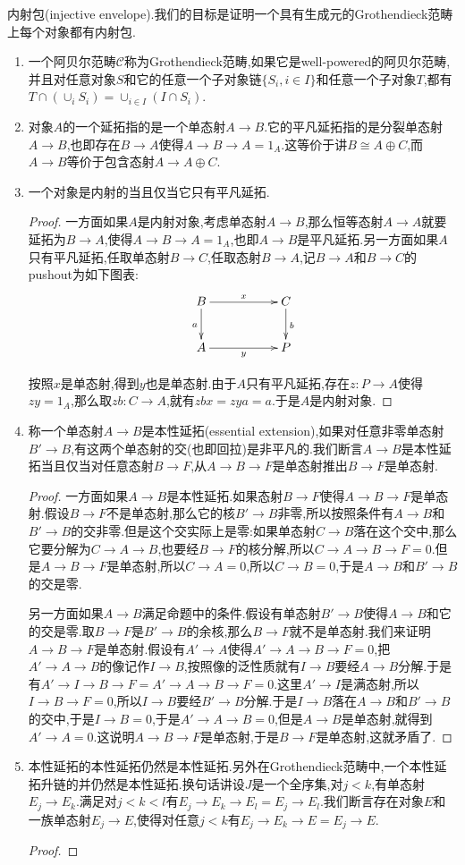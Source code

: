 内射包(injective envelope).我们的目标是证明一个具有生成元的Grothendieck范畴上每个对象都有内射包.
\begin{enumerate}
	\item 一个阿贝尔范畴$\mathscr{C}$称为Grothendieck范畴,如果它是well-powered的阿贝尔范畴,并且对任意对象$S$和它的任意一个子对象链$\{S_i,i\in I\}$和任意一个子对象$T$,都有$T\cap\left(\cup_iS_i\right)=\cup_{i\in I}(I\cap S_i)$.
	\item 对象$A$的一个延拓指的是一个单态射$A\to B$.它的平凡延拓指的是分裂单态射$A\to B$,也即存在$B\to A$使得$A\to B\to A=1_A$.这等价于讲$B\cong A\oplus C$,而$A\to B$等价于包含态射$A\to A\oplus C$.
	\item 一个对象是内射的当且仅当它只有平凡延拓.
	\begin{proof}
		
		一方面如果$A$是内射对象,考虑单态射$A\to B$,那么恒等态射$A\to A$就要延拓为$B\to A$,使得$A\to B\to A=1_A$,也即$A\to B$是平凡延拓.另一方面如果$A$只有平凡延拓,任取单态射$B\to C$,任取态射$B\to A$,记$B\to A$和$B\to C$的pushout为如下图表:
		$$\xymatrix{B\ar[rr]^x\ar[d]_a&&C\ar[d]^b\\A\ar[rr]_y&&P}$$
		
		按照$x$是单态射,得到$y$也是单态射.由于$A$只有平凡延拓,存在$z:P\to A$使得$zy=1_A$,那么取$zb:C\to A$,就有$zbx=zya=a$.于是$A$是内射对象.
	\end{proof}
    \item 称一个单态射$A\to B$是本性延拓(essential extension),如果对任意非零单态射$B'\to B$,有这两个单态射的交(也即回拉)是非平凡的.我们断言$A\to B$是本性延拓当且仅当对任意态射$B\to F$,从$A\to B\to F$是单态射推出$B\to F$是单态射.
    \begin{proof}
    	
    	一方面如果$A\to B$是本性延拓.如果态射$B\to F$使得$A\to B\to F$是单态射.假设$B\to F$不是单态射,那么它的核$B'\to B$非零,所以按照条件有$A\to B$和$B'\to B$的交非零.但是这个交实际上是零:如果单态射$C\to B$落在这个交中,那么它要分解为$C\to A\to B$,也要经$B\to F$的核分解,所以$C\to A\to B\to F=0$.但是$A\to B\to F$是单态射,所以$C\to A=0$,所以$C\to B=0$,于是$A\to B$和$B'\to B$的交是零.
    	
    	\qquad
    	
    	另一方面如果$A\to B$满足命题中的条件.假设有单态射$B'\to B$使得$A\to B$和它的交是零.取$B\to F$是$B'\to B$的余核,那么$B\to F$就不是单态射.我们来证明$A\to B\to F$是单态射.假设有$A'\to A$使得$A'\to A\to B\to F=0$,把$A'\to A\to B$的像记作$I\to B$,按照像的泛性质就有$I\to B$要经$A\to B$分解.于是有$A'\to I\to B\to F=A'\to A\to B\to F=0$.这里$A'\to I$是满态射,所以$I\to B\to F=0$,所以$I\to B$要经$B'\to B$分解.于是$I\to B$落在$A\to B$和$B'\to B$的交中,于是$I\to B=0$,于是$A'\to A\to B=0$,但是$A\to B$是单态射,就得到$A'\to A=0$.这说明$A\to B\to F$是单态射,于是$B\to F$是单态射,这就矛盾了.
    \end{proof}
    \item 本性延拓的本性延拓仍然是本性延拓.另外在Grothendieck范畴中,一个本性延拓升链的并仍然是本性延拓.换句话讲设$J$是一个全序集,对$j<k$,有单态射$E_j\to E_k$.满足对$j<k<l$有$E_j\to E_k\to E_l=E_j\to E_l$.我们断言存在对象$E$和一族单态射$E_j\to E$,使得对任意$j<k$有$E_j\to E_k\to E=E_j\to E$.
    \begin{proof}
    	

\end{proof}
\end{enumerate}
